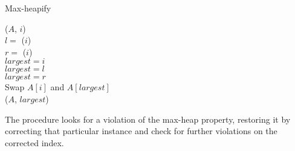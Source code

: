 \clearpage

\begin{algorithm}[H]
	\caption{Max-heapify}
	\label{alg:max-heapify}




	\BlankLine
	\MaxHeapify($A$, $i$) \\
	\Begin
	{
		$l = $ \Left($i$) \\
		$r = $ \Right($i$) \\
		$largest = i$ \\
		{
			$largest = l$ \\
		}
		{
			$largest = r$ \\
		}
		{
			Swap $A[i]$ and $A[largest]$ \\
			\MaxHeapify($A$, $largest$)
		}
	}
\end{algorithm}
The procedure looks for a violation of the max-heap property, restoring it by
correcting that particular instance and check for further violations on the
corrected index.


